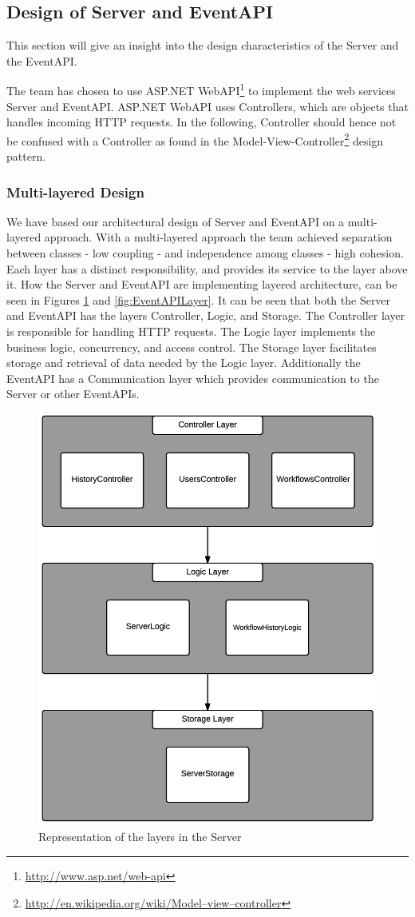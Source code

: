 \subsection{Design of Server and EventAPI}
This section will give an insight into the design characteristics of the Server and the EventAPI.

The team has chosen to use ASP.NET WebAPI\footnote{\url{http://www.asp.net/web-api}} to implement the web services Server and EventAPI. ASP.NET WebAPI uses Controllers, which are objects that handles incoming HTTP requests. In the following, Controller should hence not be confused with a Controller as found in the Model-View-Controller\footnote{\url{http://en.wikipedia.org/wiki/Model–view–controller}} design pattern. 

\subsubsection{Multi-layered Design}
We have based our architectural design of Server and EventAPI on a multi-layered approach. With a multi-layered approach the team achieved separation between classes - low coupling - and independence among classes - high cohesion. Each layer has a distinct responsibility, and provides its service to the layer above it. How the Server and EventAPI are implementing layered architecture, can be seen in Figures \ref{fig:ServerLayer} and \ref{fig:EventAPILayer}. It can be seen that both the Server and EventAPI has the layers Controller, Logic, and Storage. The Controller layer is responsible for handling HTTP requests. The Logic layer implements the business logic, concurrency, and access control. The Storage layer facilitates storage and retrieval of data needed by the Logic layer. Additionally the EventAPI has a Communication layer which provides communication to the Server or other EventAPIs.

\begin{figure}[h!]
\centering
\includegraphics[width=0.6\linewidth]{figures/ServerLayers}
\caption{\label{fig:ServerLayer}  Representation of the layers in the Server}
\end{figure}

